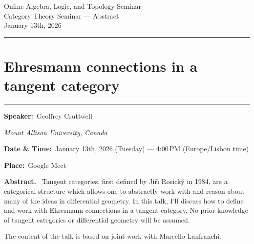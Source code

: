 \documentclass[11pt,a4paper]{article}
\newcommand{\Title}[1]{\section*{#1}\vspace{-0.25em}\hrule\vspace{0.8em}}
\newcommand{\Field}[2]{\textbf{#1:}~#2\par}
\newcommand{\Affil}[1]{\textit{#1}\par}
\newcommand{\Abstract}{\vspace{0.6em}\textbf{Abstract.}~}
\begin{document}
	
	\begin{center}
		{\LARGE Online Algebra, Logic, and Topology Seminar}\\[0.25em]
		{\large Category Theory Seminar — Abstract}\\[0.5em]
		January 13th, 2026
	\end{center}
	
	\vspace{1.25em}\hrule\vspace{1.25em}
	
	\Title{Ehresmann connections in a tangent category}
	
	\Field{Speaker}{Geoffrey Cruttwell}
	\Affil{\hspace{1.15cm}Mount Allison University, Canada}
	
	\noindent \Field{Date \& Time}{January 13th, 2026 (Tuesday) — 4{:}00\,PM (Europe/Lisbon time)}
	\noindent \Field{Place}{Google Meet}
	
	\Abstract
	Tangent categories, first defined by Ji\v{r}\'{\i} Rosick\'y in 1984, are a categorical structure which allows one to abstractly work with and reason about many of the ideas in differential geometry. In this talk, I'll discuss how to define and work with Ehresmann connections in a tangent category. No prior knowledge of tangent categories or differential geometry will be assumed.
	
	\vspace{1em}
	
	The content of the talk is based on joint work with Marcello Lanfranchi.
	
\end{document}
